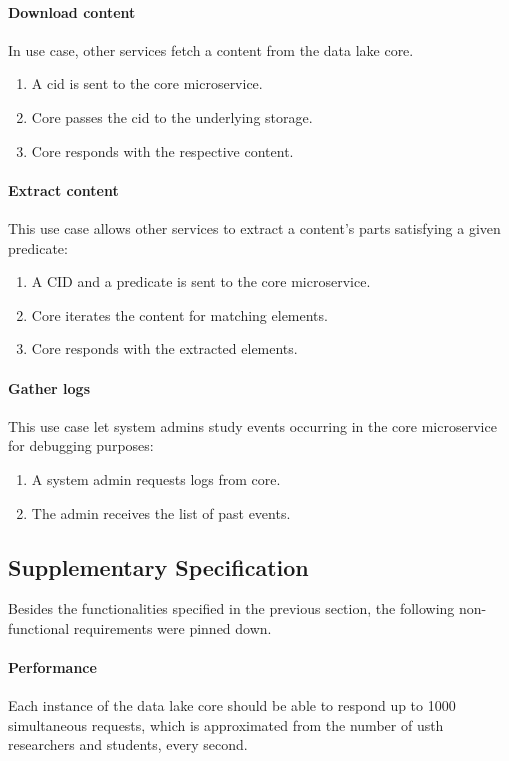 \documentclass[a4paper,oneside,12pt]{book}
\begin{document}
\paragraph{Download content}  In use case, other services fetch a \gls{content}
from the data lake core.
\begin{enumerate}
  \item A \gls{cid} is sent to the core microservice.
  \item Core passes the \gls{cid} to the underlying storage.
  \item Core responds with the respective \gls{content}.
\end{enumerate}

\paragraph{Extract content}  This use case allows other services
to extract a content's parts satisfying a given \gls{predicate}:
\begin{enumerate}
  \item A CID and a \gls{predicate} is sent to the core microservice.
  \item Core iterates the content for matching elements.
  \item Core responds with the extracted elements.
\end{enumerate}

\paragraph{Gather logs}  This use case let system admins study
events occurring in the core microservice for debugging purposes:
\begin{enumerate}
  \item A system admin requests logs from core.
  \item The admin receives the list of past events.
\end{enumerate}

\subsection{Supplementary Specification}
Besides the functionalities specified in the previous section,
the following non-functional requirements were pinned down.

\paragraph{Performance}  Each instance of the data lake core should be able
to respond up to 1000 simultaneous requests, which is approximated
from the number of \gls{usth} researchers and students, every second.
\end{document}
